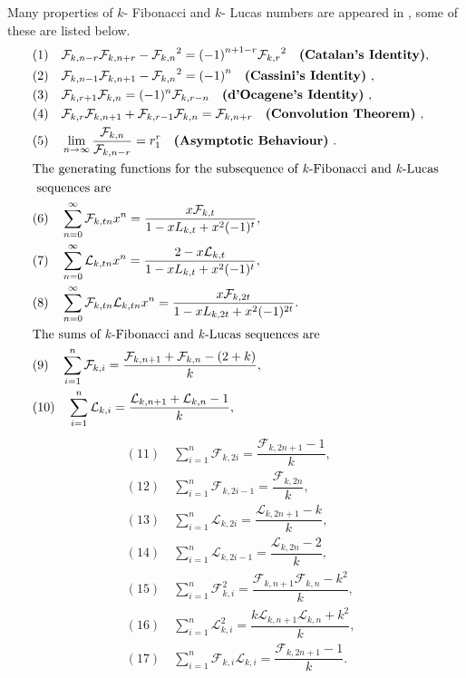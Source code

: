 Many properties of $k$- Fibonacci and $k$- Lucas numbers are appeared in \cite{4, 5}, some of these are listed below.
\begin{align*}
&(1)\quad \mathcal{F}_{k,n-r}\mathcal{F}_{k,n+r}-{\mathcal{F}_{k,n}}^2={(-1)}^{n+1-r}{\mathcal{F}_{k,r}}^2\quad \text{\textbf{(Catalan's Identity)}},\\
&(2)\quad \mathcal{F}_{k,n-1}\mathcal{F}_{k,n+1}-{\mathcal{F}_{k,n}}^2={(-1)}^{n}\quad \text{\textbf{(Cassini's Identity)} },\\
&(3)\quad \mathcal{F}_{k,r+1}\mathcal{F}_{k,n}=(-1)^n \mathcal{F}_{k,r-n}\quad \text{\textbf{(d'Ocagene's Identity)} },\\
&(4)\quad \mathcal{F}_{k,r} \mathcal{F}_{k,n+1} + \mathcal{F}_{k,r-1}\mathcal{F}_{k,n} = \mathcal{F}_{k,n+r}\quad \text{\textbf{(Convolution Theorem)} },\\
&(5)\quad \lim_{n \to \infty }\dfrac{\mathcal{F}_{k,n}}{\mathcal{F}_{k,n-r}}=r_{1}^r\quad \text{\textbf{(Asymptotic Behaviour)} }.\\
&\text{The generating functions for the subsequence of \kF\vspace{0mm} and \kL\vspace{0mm}}\\&\text{ sequences are}\\ 
&(6)\quad  \sum_{n=0}^{\infty}\mathcal{F}_{k,tn}x^n=\dfrac{x\mathcal{F}_{k,t}}{1-xL_{k,t}+x^2(-1)^t},\\
&(7)\quad \sum_{n=0}^{\infty}\mathcal{L}_{k,tn}x^n=\dfrac{2-x\mathcal{L}_{k,t}}{1-xL_{k,t}+x^2(-1)^t},\\
&(8)\quad \sum_{n=0}^{\infty}\mathcal{F}_{k,tn}\mathcal{L}_{k,tn}x^n=\dfrac{x\mathcal{F}_{k,2t}}{1-xL_{k,2t}+x^2(-1)^{2t}}.\\
&\text{The sums of \kF\vspace{0mm} and \kL\vspace{0mm} sequences are}\\ 
&(9)\quad \sum_{i=1}^{n}\mathcal{F}_{k,i}=\dfrac{\mathcal{F}_{k,n+1}+\mathcal{F}_{k,n}-(2+k)}{k},\\
&(10)\quad\sum_{i=1}^{n}\mathcal{L}_{k,i}=\dfrac{\mathcal{L}_{k,n+1}+\mathcal{L}_{k,n}-1}{k},\\
\end{align*}
\begin{align*}
&(11)\quad \sum_{i=1}^{n}\mathcal{F}_{k,2i}=\dfrac{\mathcal{F}_{k,2n+1}-1}{k},\\
&(12)\quad \sum_{i=1}^{n}\mathcal{F}_{k,2i-1}=\dfrac{\mathcal{F}_{k,2n}}{k},\\
&(13)\quad \sum_{i=1}^{n}\mathcal{L}_{k,2i}=\dfrac{\mathcal{L}_{k,2n+1}-k}{k},\\
&(14)\quad \sum_{i=1}^{n}\mathcal{L}_{k,2i-1}=\dfrac{\mathcal{L}_{k,2n}-2}{k},\\
&(15)\quad \sum_{i=1}^{n}\mathcal{F}_{k,i}^2=\dfrac{\mathcal{F}_{k,n+1}\mathcal{F}_{k,n}-k^2}{k},\\
&(16)\quad \sum_{i=1}^{n}\mathcal{L}_{k,i}^2=\dfrac{k\mathcal{L}_{k,n+1}\mathcal{L}_{k,n}+k^2}{k},\\
&(17)\quad \sum_{i=1}^{n}\mathcal{F}_{k,i}\mathcal{L}_{k,i}=\dfrac{\mathcal{F}_{k,2n+1}-1}{k}.
 \end{align*}
